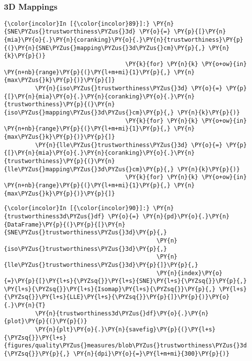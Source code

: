     \begin{center}
    \end{center}
    { \hspace*{\fill} \\}

    \subsubsection{3D Mappings}\label{d-mappings}

    \begin{Verbatim}[commandchars=\\\{\}]
{\color{incolor}In [{\color{incolor}89}]:} \PY{n}{SNE\PYZus{}trustworthiness\PYZus{}3d} \PY{o}{=} \PY{p}{[}\PY{n}{mia}\PY{o}{.}\PY{n}{coranking}\PY{o}{.}\PY{n}{trustworthiness}\PY{p}{(}\PY{n}{SNE\PYZus{}mapping\PYZus{}3d\PYZus{}cm}\PY{p}{,} \PY{n}{k}\PY{p}{)}
                                   \PY{k}{for} \PY{n}{k} \PY{o+ow}{in} \PY{n+nb}{range}\PY{p}{(}\PY{l+m+mi}{1}\PY{p}{,} \PY{n}{max\PYZus{}k}\PY{p}{)}\PY{p}{]}
         \PY{n}{iso\PYZus{}trustworthiness\PYZus{}3d} \PY{o}{=} \PY{p}{[}\PY{n}{mia}\PY{o}{.}\PY{n}{coranking}\PY{o}{.}\PY{n}{trustworthiness}\PY{p}{(}\PY{n}{iso\PYZus{}mapping\PYZus{}3d\PYZus{}cm}\PY{p}{,} \PY{n}{k}\PY{p}{)}
                                   \PY{k}{for} \PY{n}{k} \PY{o+ow}{in} \PY{n+nb}{range}\PY{p}{(}\PY{l+m+mi}{1}\PY{p}{,} \PY{n}{max\PYZus{}k}\PY{p}{)}\PY{p}{]}
         \PY{n}{lle\PYZus{}trustworthiness\PYZus{}3d} \PY{o}{=} \PY{p}{[}\PY{n}{mia}\PY{o}{.}\PY{n}{coranking}\PY{o}{.}\PY{n}{trustworthiness}\PY{p}{(}\PY{n}{lle\PYZus{}mapping\PYZus{}3d\PYZus{}cm}\PY{p}{,} \PY{n}{k}\PY{p}{)}
                                   \PY{k}{for} \PY{n}{k} \PY{o+ow}{in} \PY{n+nb}{range}\PY{p}{(}\PY{l+m+mi}{1}\PY{p}{,} \PY{n}{max\PYZus{}k}\PY{p}{)}\PY{p}{]}
\end{Verbatim}

    \begin{Verbatim}[commandchars=\\\{\}]
{\color{incolor}In [{\color{incolor}90}]:} \PY{n}{trustworthiness3d\PYZus{}df} \PY{o}{=} \PY{n}{pd}\PY{o}{.}\PY{n}{DataFrame}\PY{p}{(}\PY{p}{[}\PY{n}{SNE\PYZus{}trustworthiness\PYZus{}3d}\PY{p}{,}
                                            \PY{n}{iso\PYZus{}trustworthiness\PYZus{}3d}\PY{p}{,}
                                            \PY{n}{lle\PYZus{}trustworthiness\PYZus{}3d}\PY{p}{]}\PY{p}{,}
                                            \PY{n}{index}\PY{o}{=}\PY{p}{[}\PY{l+s}{\PYZsq{}}\PY{l+s}{SNE}\PY{l+s}{\PYZsq{}}\PY{p}{,} \PY{l+s}{\PYZsq{}}\PY{l+s}{Isomap}\PY{l+s}{\PYZsq{}}\PY{p}{,} \PY{l+s}{\PYZsq{}}\PY{l+s}{LLE}\PY{l+s}{\PYZsq{}}\PY{p}{]}\PY{p}{)}\PY{o}{.}\PY{n}{T}
         \PY{n}{trustworthiness3d\PYZus{}df}\PY{o}{.}\PY{n}{plot}\PY{p}{(}\PY{p}{)}
         \PY{n}{plt}\PY{o}{.}\PY{n}{savefig}\PY{p}{(}\PY{l+s}{\PYZsq{}}\PY{l+s}{figures/quality\PYZus{}measures/blob\PYZus{}trustworthiness\PYZus{}3d.png}\PY{l+s}{\PYZsq{}}\PY{p}{,} \PY{n}{dpi}\PY{o}{=}\PY{l+m+mi}{300}\PY{p}{)}
\end{Verbatim}

